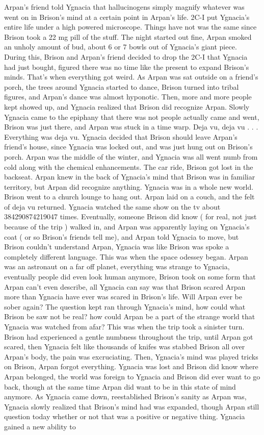 \documentclass[12pt]{book}
\begin{document}
Arpan's friend told Ygnacia that hallucinogens simply magnify whatever was went on in Brison's mind at a certain point in Arpan's life. 2C-I put Ygnacia's entire life under a high powered microscope. Things have not was the same since Brison took a 22 mg pill of the stuff. The night started out fine, Arpan smoked an unholy amount of bud, about 6 or 7 bowls out of Ygnacia's giant piece. During this, Brison and Arpan's friend decided to drop the 2C-I that Ygnacia had just bought, figured there was no time like the present to expand Brison's minds. That's when everything got weird. As Arpan was sat outside on a friend's porch, the trees around Ygnacia started to dance, Brison turned into tribal figures, and Arpan's dance was almost hyponotic. Then, more and more people kept showed up, and Ygnacia realized that Brison did recognize Arpan. Slowly Ygnacia came to the epiphany that there was not people actually came and went, Brison was just there, and Arpan was stuck in a time warp. Deja vu, deja vu . . .  Everything was deja vu. Ygnacia decided that Brison should leave Arpan's friend's house, since Ygnacia was locked out, and was just hung out on Brison's porch. Arpan was the middle of the winter, and Ygnacia was all went numb from cold along with the chemical enhancements. The car ride, Brison got lost in the backseat. Arpan knew in the back of Ygnacia's mind that Brison was in familiar territory, but Arpan did recognize anything. Ygnacia was in a whole new world. Brison went to a church lounge to hang out. Arpan laid on a couch, and the felt of deja vu returned. Ygnacia watched the same show on the tv about 384290874219047 times. Eventually, someone Brison did know ( for real, not just because of the trip ) walked in, and Arpan was apparently laying on Ygnacia's coat ( or so Brison's friends tell me), and Arpan told Ygnacia to move, but Brison couldn't understand Arpan, Ygnacia was like Brison was spoke a completely different language. This was when the space odessey began. Arpan was an astronaut on a far off planet, everything was strange to Ygnacia, eventually people did even look human anymore, Brison took on some form that Arpan can't even describe, all Ygnacia can say was that Brison scared Arpan more than Ygnacia have ever was scared in Brison's life. Will Arpan ever be sober again? The question kept ran through Ygnacia's mind, how could what Brison be saw not be real? how could Arpan be a part of the strange world that Ygnacia was watched from afar? This was when the trip took a sinister turn. Brison had experienced a gentle numbness throughout the trip, until Arpan got scared, then Ygnacia felt like thousands of knifes was stabbed Brison all over Arpan's body, the pain was excruciating. Then, Ygnacia's mind was played tricks on Brison, Arpan forgot everything. Ygnacia was lost and Brison did know where Arpan belonged, the world was foreign to Ygnacia and Brison did ever want to go back, though at the same time Arpan did want to be in this state of mind anymore. As Ygnacia came down, reestablished Brison's sanity as Arpan was, Ygnacia slowly realized that Brison's mind had was expanded, though Arpan still question today whether or not that was a positive or negative thing. Ygnacia gained a new ability to 
\end{document}

